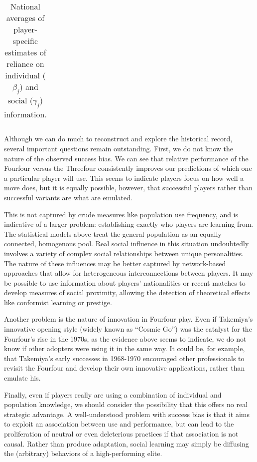 \documentclass{article}
\begin{document}
\begin{table}[tbp]
  \centering
    \begin{tabular}{lrrrrr}
	
    \end{tabular}%
	\caption{National averages of player-specific estimates of reliance on individual ($\beta_j$) and social ($\gamma_j$) information.}
\end{table}%

Although we can do much to reconstruct and explore the historical record, several important questions remain outstanding.  First, we do not know the nature of the observed success bias.  We can see that relative performance of the Fourfour versus the Threefour consistently improves our predictions of which one a particular player will use.  This seems to indicate players focus on how well a move does, but it is equally possible, however, that successful players rather than successful variants are what are emulated.  

This is not captured by crude measures like population use frequency, and is indicative of a larger problem: establishing exactly who players are learning from.  The statistical models above treat the general population as an equally-connected, homogenous pool.  Real social influence in this situation undoubtedly involves a variety of complex social relationships between unique personalities.  The nature of these influences may be better captured by network-based approaches that allow for heterogeneous interconnections between players.  It may be possible to use information about players' nationalities or recent matches to develop measures of social proximity, allowing the detection of theoretical effects like conformist learning or prestige.

Another problem is the nature of innovation in Fourfour play.  Even if Takemiya's innovative opening style (widely known as ``Cosmic Go'') was the catalyst for the Fourfour's rise in the 1970s, as the evidence above seems to indicate, we do not know if other adopters were using it in the same way.  It could be, for example, that Takemiya's early successes in 1968-1970 encouraged other professionals to revisit the Fourfour and develop their own innovative applications, rather than emulate his.  

Finally, even if players really are using a combination of individual and population knowledge, we should consider the possibility that this offers no real strategic advantage.  A well-understood problem with success bias is that it aims to exploit an association between use and performance, but can lead to the proliferation of neutral or even deleterious practices if that association is not causal.  Rather than produce adaptation, social learning may simply be diffusing the (arbitrary) behaviors of a high-performing elite.
\end{document}
